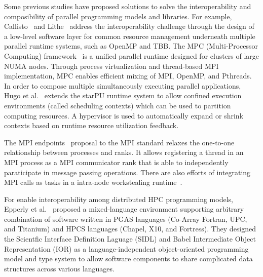 Some previous studies have proposed solutions to solve the interoperability and composibility of parallel programming models and libraries. 
For example, Callisto~\cite{Callisto:Harris:2014:CCP:2592798.2592807} and
Lithe~\cite{Lithe:Pan:2009:LEE:1855591.1855602} 
address the interoperability challenge 
through the design of a low-level software layer for common 
resource management underneath multiple parallel runtime systems, such as OpenMP and TBB. %
The MPC (Multi-Processor Computing) framework~\cite{perache2008mpc} is a unified parallel runtime designed for clusters of large NUMA nodes. 
Through process virtualization and thread-based MPI implementation, MPC enables efficient mixing of MPI, OpenMP, and Pthreads. 
In order to compose multiple simultaneously executing parallel applications, Hugo et al.~\cite{hugo2014composing} extends the starPU runtime system to allow confined execution environments (called scheduling contexts) which can be used to partition computing resources. 
A hypervisor is used to automatically expand or shrink contexts based on runtime resource utilization feedback. 

The MPI endpoints~\cite{Dinan:mpiendpoint_eurompi13}
proposal to the MPI standard relaxes the one-to-one relationship between processes and ranks.
It allows registering a thread in an MPI
process as a MPI communicator rank that is able to independently paraticipate
in message passing operations. There are also efforts of integrating MPI calls as
tasks in a intra-node workstealing runtime~\cite{hcmpi:ipdps13}.

For enable interoperability among distributed HPC programming models, Epperly et al.~\cite{epperly2011composite} proposed a mixed-language environment supporting arbitrary combination of software written in PGAS languages (Co-Array Fortran, UPC, and Titanium) and HPCS languages (Chapel, X10, and Fortress). 
They designed the Scientfic Interface Definition Laguage (SIDL) and Babel Intermediate Object Representation (IOR) as a language-independent object-oriented programming model and type system
to allow software components to share complicated data structures across various languages. 
